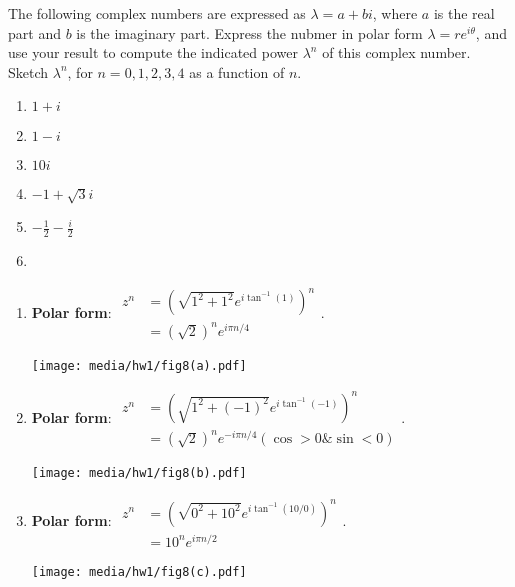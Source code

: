 \documentclass[
    classnum=MATH564,
    classname=MATHEMATICAL\ MODELING,
    due=January\ 28\,\ 2020,
    author=Gabrielle\ Streeter\qquad Hannah\ Wu\qquad\ Minghang\ Li,
    authorshort=Streeter\ \&\ Wu\ \&\ Li,
    teacher= Zachary\ M.\ Boyd,
    hw=1
]{hw-template}
\newenvironment{Figure}
  {\par\medskip\noindent\minipage{\linewidth}}
  {\endminipage\par\medskip}
\begin{document}
\begin{homeworkProblem}
The following complex numbers are expressed as $\lambda=a+bi$, where $a$ is the
real part and $b$ is the imaginary part. Express the nubmer in polar form
$\lambda = re^{i\theta}$, and use your result to compute the indicated power
$\lambda^n$ of this complex number. Sketch $\lambda^n$, for $n = 0, 1, 2, 3, 4$
as a function of $n$.
\begin{multicols}{2}
    \begin{enumerate}
        \item $1+i$
        \item $1-i$
        \item $10i$
        \item $-1+\sqrt{3}i$
        \item $-\frac{1}{2} - \frac{i}{2}$
        \item[\vspace{\fill}] %
    \end{enumerate}
\end{multicols}

\segline

\solution

\begin{multicols}{2}
\begin{enumerate}

\item \textbf{Polar form}:
$\begin{aligned}
    z^n &= (\sqrt{1^2 + 1^2} e^{i\tan^{-1}(1)})^n\\ &= (\sqrt{2})^n e^{i\pi n/4}
\end{aligned}$.
\begin{Figure}
    \centering
    \texttt{[image: media/hw1/fig8(a).pdf]}
\end{Figure}

\item \textbf{Polar form}:
$\begin{aligned}
    z^n &= (\sqrt{1^2 + (-1)^2} e^{i\tan^{-1}(-1)})^n\\
    &= (\sqrt{2})^n e^{-i\pi n/4} (\cos > 0\& \sin < 0)
\end{aligned}$.
\begin{Figure}
    \centering
    \texttt{[image: media/hw1/fig8(b).pdf]}
\end{Figure}

\item \textbf{Polar form}:
$\begin{aligned}
    z^n &= (\sqrt{0^2 + 10^2} e^{i\tan^{-1}(10/0)})^n\\ &= 10^ne^{i\pi n/2}
\end{aligned}$.
\begin{Figure}
    \centering
    \texttt{[image: media/hw1/fig8(c).pdf]}
\end{Figure}


\end{enumerate}
\end{multicols}
\end{homeworkProblem}
\end{document}
